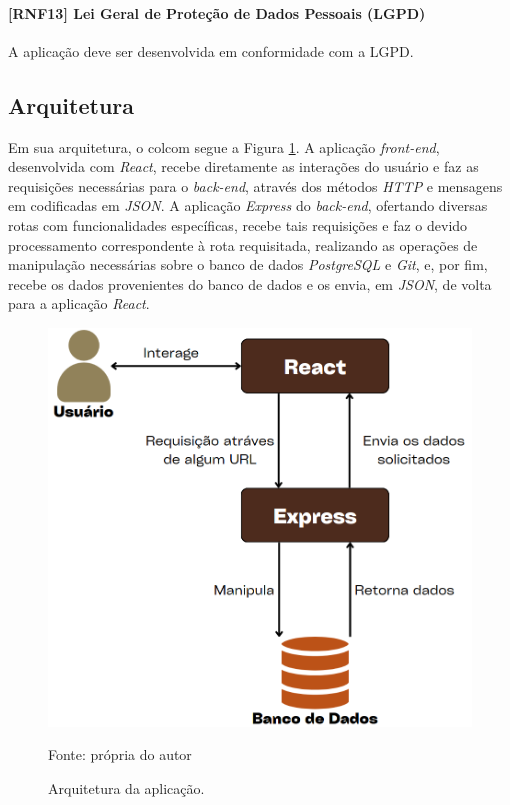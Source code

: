 \paragraph{[RNF13] Lei Geral de Proteção de Dados Pessoais (LGPD)}
A aplicação deve ser desenvolvida em conformidade com a LGPD.


\subsection{Arquitetura}

Em sua arquitetura, o colcom segue a Figura \ref{fig:architecture}. A aplicação \textit{front-end}, desenvolvida com \textit{React}, recebe diretamente as interações do usuário e faz as requisições necessárias para o \textit{back-end}, através dos métodos \textit{HTTP} e mensagens em codificadas em \textit{JSON}. A aplicação \textit{Express} do \textit{back-end}, ofertando diversas rotas com funcionalidades específicas, recebe tais requisições e faz o devido processamento correspondente à rota requisitada, realizando as operações de manipulação necessárias sobre o banco de dados \textit{PostgreSQL} e \textit{Git}, e, por fim, recebe os dados provenientes do banco de dados e os envia, em \textit{JSON}, de volta para a aplicação \textit{React}.

\begin{figure}[hbt!]
\centering
\includegraphics[width=0.5\linewidth]{imagens/architecture.png}
\caption{Arquitetura da aplicação.}
Fonte: própria do autor
\label{fig:architecture}
\end{figure}

